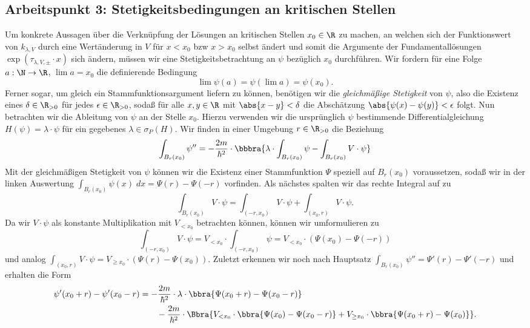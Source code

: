 \documentclass{subfiles}
\begin{document}
    \subsection{Arbeitspunkt 3: Stetigkeitsbedingungen an kritischen Stellen}
        Um konkrete Aussagen über die Verknüpfung der Lösungen an kritischen Stellen $x_0\in\R$ zu machen, an welchen sich der Funktionswert von $k_{\lambda,V}$ durch eine Wertänderung in $V$ für $x<x_0$ bzw $x>x_0$ selbst ändert und somit die Argumente der Fundamentallösungen $\exp(\tau_{\lambda,V,\pm}\cdot x)$ sich ändern, müssen wir eine Stetigkeitsbetrachtung an $\psi$ bezüglich $x_0$ durchführen. Wir fordern für eine Folge $a:\N\to\R$, $\lim a = x_0$ die definierende Bedingung
        \[
            \lim \psi(a) = \psi(\lim a) = \psi(x_0). 
        \] 
        Ferner sogar, um gleich ein Stammfunktionsargument liefern zu können, benötigen wir die \emph{gleichmäßige Stetigkeit} von $\psi$, also die Existenz eines $\delta\in\R_{>0}$ für jedes $\epsilon\in\R_{>0}$, sodaß für alle $x,y\in\R$ mit $\abs{x-y}<\delta$ die Abschätzung $\abs{\psi(x)-\psi(y)}<\epsilon$ folgt. 
        Nun betrachten wir die Ableitung von $\psi$ an der Stelle $x_0$. Hierzu verwenden wir die ursprünglich $\psi$ bestimmende Differentialgleichung $H(\psi) = \lambda\cdot\psi$ für ein gegebenes $\lambda\in\sigma_P(H)$. Wir finden in einer Umgebung $r\in\R_{>0}$ die Beziehung
        \[
            \int_{B_r(x_0)}\psi'' = -\frac{2m}{\hbar^2}\cdot \bbbra{
                \lambda\cdot\int_{B_r(x_0)}\psi - \int_{B_r(x_0)}V\cdot\psi
            }
        \] 
        Mit der gleichmäßigen Stetigkeit von $\psi$ können wir die Existenz einer Stammfunktion $\Psi$ speziell auf $B_r(x_0)$ voraussetzen, sodaß wir in der linken Auswertung $\int_{B_r(x_0)}\psi(x)\; dx = \Psi(r) - \Psi(-r)$ vorfinden. Als nächstes spalten wir das rechte Integral auf zu 
        \[
            \int_{B_r(x_0)}V\cdot\psi = \int_{(-r,x_0)}V\cdot\psi + \int_{(x_0,r)}V\cdot\psi.
        \]
        Da wir $V\cdot\psi$ als konstante Multiplikation mit $V_{<x_0}$ betrachten können, können wir umformulieren zu 
        \[
            \int_{(-r,x_0)}V\cdot\psi = V_{<x_0}\cdot\int_{(-r,x_0)}\psi = V_{<x_0}\cdot(\Psi(x_0) - \Psi(-r))
        \]
        und analog $\int_{(x_0,r)}V\cdot\psi = V_{\geq x_0}\cdot(\Psi(r) - \Psi(x_0))$. Zuletzt erkennen wir noch nach Hauptsatz $\int_{B_r(x_0)}\psi'' = \Psi'(r) - \Psi'(-r)$ und erhalten die Form
        \begin{align*}
            \psi'(x_0 + r) - \psi'(x_0-r) &= -\frac{2m}{\hbar^2}\cdot \lambda\cdot\bbra{\Psi(x_0 + r) - \Psi(x_0 - r)} \\
            &\qquad - \frac{2m}{\hbar^2}\cdot\Bbra{
                V_{<x_0}\cdot\bbra{\Psi(x_0) - \Psi(x_0 - r)} + V_{\geq x_0}\cdot\bbra{\Psi(x_0 + r) - \Psi(x_0)}
            }.
        \end{align*}
\end{document}
